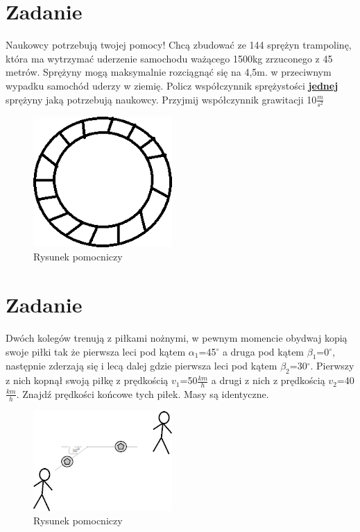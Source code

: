 \documentclass[14pt]{extarticle}
\begin{document}
    \section{Zadanie}
    \begin{flushleft}
        Naukowcy potrzebują twojej pomocy! Chcą zbudować ze 144 sprężyn trampolinę, która ma wytrzymać uderzenie samochodu ważącego 1500kg zrzuconego z 45 metrów.
        Sprężyny mogą maksymalnie rozciągnąć się na 4,5m. w przeciwnym wypadku samochód uderzy w ziemię.
        Policz współczynnik sprężystości \textbf{\underline{jednej}} sprężyny jaką potrzebują naukowcy.
        Przyjmij współczynnik grawitacji 10$\frac{m}{s^2}$
    \end{flushleft}
    \begin{figure}[H]
        \centering
        \includegraphics{trampolina}
        \caption{Rysunek pomocniczy}
    \end{figure}
    \clearpage
    \section{Zadanie}
    \begin{flushleft}
        Dwóch kolegów trenują z piłkami nożnymi, w pewnym momencie obydwaj kopią swoje piłki tak że pierwsza leci pod kątem $\alpha _1$=45$^\circ$ a druga pod kątem $\beta _1$=0$^\circ$,
        następnie zderzają się i lecą dalej gdzie pierwsza leci pod kątem $\beta _2$=30$^\circ$.
        Pierwszy z nich kopnął swoją piłkę z prędkością $v_1$=50$\frac{km}{h}$ a drugi z nich z prędkością $v_2$=40$\frac{km}{h}$.
        Znajdź prędkości końcowe tych piłek. Masy są identyczne.
    \end{flushleft}
    \begin{figure}[H]
        \centering
        \includegraphics{pilki}
        \caption{Rysunek pomocniczy}
    \end{figure}
\end{document}
